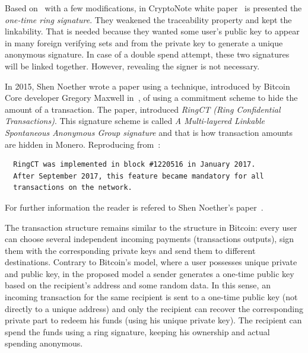 Based on~\cite{traceable2} with a few modifications, in CryptoNote white paper~\cite{citeulike:14139412} is presented the \emph{one-time ring signature}. They weakened the traceability property and kept the linkability. That is needed because they wanted some user's public key to appear in many foreign verifying sets and from the private key to generate a unique anonymous signature. In case of a double spend attempt, these two signatures will be linked together. However, revealing the signer is not necessary.

In 2015, Shen Noether wrote a paper using a technique, introduced by Bitcoin Core developer Gregory Maxwell in~\cite{CT}, of using a commitment scheme to hide the amount of a transaction. The paper, introduced \emph{RingCT (Ring Confidential Transactions)}. This signature scheme is called \emph{A Multi-layered Linkable Spontaneous Anonymous Group signature} and that is how transaction amounts are hidden in Monero. Reproducing from~\cite{getmonero}:

\begin{verbatim}
  RingCT was implemented in block #1220516 in January 2017.
  After September 2017, this feature became mandatory for all
  transactions on the network.
\end{verbatim}
For further information the reader is refered to Shen Noether's paper~\cite{ringCT}.

The transaction structure remains similar to the structure in Bitcoin: every user can choose several independent incoming payments (transactions outputs), sign them with the corresponding private keys and send them to different destinations. Contrary to Bitcoin’s model, where a user possesses unique private and public key, in the proposed model a sender generates a one-time public key based on the recipient’s address and some random data. In this sense, an incoming transaction for the same recipient is sent to a one-time public key (not directly  to a unique  address) and only the recipient can recover the corresponding private part to redeem his funds (using his unique private key). The recipient can spend the funds using a ring signature, keeping his ownership and actual spending anonymous.


